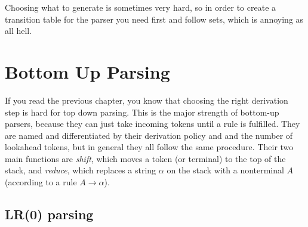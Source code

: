 \documentclass{article}
\begin{document}
Choosing what to generate is sometimes very hard, so in order to create a transition table for the parser you need first and follow sets, which is annoying as all hell.

\section{Bottom Up Parsing}
If you read the previous chapter, you know that choosing the right derivation step is hard for top down parsing.
This is the major strength of bottom-up parsers, because they can just take incoming tokens until a rule is fulfilled.
They are named and differentiated by their derivation policy and and the number of lookahead tokens, but in general they all follow the same procedure.
Their two main functions are \emph{shift}, which moves a token (or terminal) to the top of the stack, and \emph{reduce}, which replaces a string $\alpha$ on the stack with a nonterminal $A$ (according to a rule $A \rightarrow \alpha$).

\subsection{LR(0) parsing}
\end{document}
